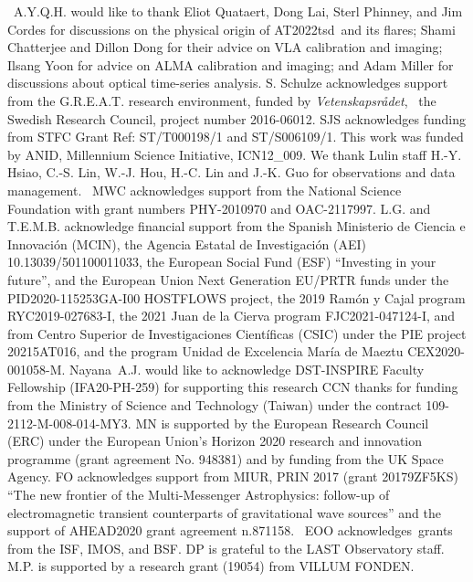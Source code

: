 \documentclass{nature_plusfigure}
\newcommand{\at}{AT2022tsd}
\begin{document}
\begin{addendum}

\item   A.Y.Q.H. would like to thank Eliot Quataert, Dong Lai, Sterl Phinney, and Jim Cordes for discussions on the physical origin of \at\ and its flares; Shami Chatterjee and Dillon Dong for their advice on VLA calibration and imaging; Ilsang Yoon for advice on ALMA calibration and imaging; and Adam Miller for discussions about optical time-series analysis.
S. Schulze acknowledges support from the G.R.E.A.T. research environment, funded by {\em Vetenskapsr\aa det},  the Swedish Research Council, project number 2016-06012.
SJS acknowledges funding from STFC Grant Ref: ST/T000198/1 and ST/S006109/1.
This work was funded by ANID, Millennium Science Initiative, ICN12\_009.
We thank Lulin staff H.-Y. Hsiao, C.-S. Lin, W.-J. Hou, H.-C. Lin and J.-K. Guo for observations and data management. 
MWC acknowledges support from the National Science Foundation with grant numbers PHY-2010970 and OAC-2117997.
L.G. and T.E.M.B. acknowledge financial support from the Spanish Ministerio de Ciencia e Innovaci\'on (MCIN), the Agencia Estatal de Investigaci\'on (AEI) 10.13039/501100011033, the European Social Fund (ESF) ``Investing in your future'', and the European Union Next Generation EU/PRTR funds under the PID2020-115253GA-I00 HOSTFLOWS project, the 2019 Ram\'on y Cajal program RYC2019-027683-I, the 2021 Juan de la Cierva program FJC2021-047124-I, and from Centro Superior de Investigaciones Cient\'ificas (CSIC) under the PIE project 20215AT016, and the program Unidad de Excelencia Mar\'ia de Maeztu CEX2020-001058-M.
Nayana A.J. would like to acknowledge DST-INSPIRE Faculty Fellowship (IFA20-PH-259) for supporting this research
CCN thanks for funding from the Ministry of Science and Technology (Taiwan) under the contract 109-2112-M-008-014-MY3.
MN is supported by the European Research Council (ERC) under the European Union’s Horizon 2020 research and innovation programme (grant agreement No. 948381) and by funding from the UK Space Agency.
FO acknowledges support from MIUR, PRIN 2017 (grant 20179ZF5KS) ``The new frontier of the Multi-Messenger Astrophysics: follow-up of electromagnetic transient counterparts of gravitational wave sources'' and the support of AHEAD2020 grant agreement n.871158. 
EOO acknowledges grants from the ISF, IMOS, and BSF.
DP is grateful to the LAST Observatory staff.
M.P. is supported by a research grant (19054) from VILLUM FONDEN.


\end{addendum}
\end{document}
